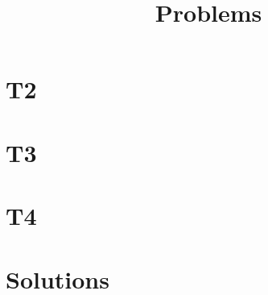 \documentclass[11pt]{amsart}
\title{Problems}
\date{}
\theoremstyle{definition}
\begin{document}
\maketitle

\section{T2}

\section{T3}

\section{T4}

\clearpage
\section{Solutions}



\end{document}
